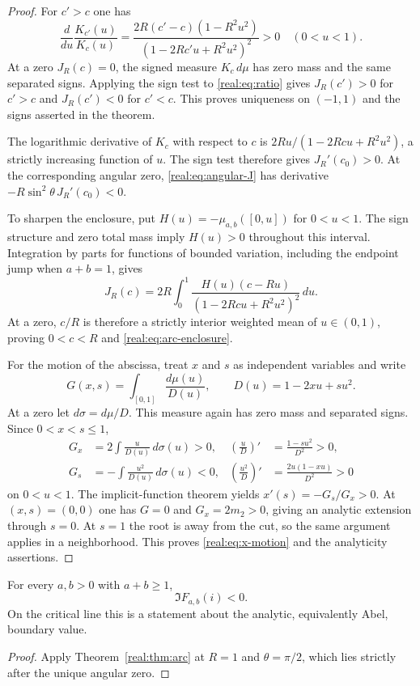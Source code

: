 \begin{proof}
For $c'>c$ one has
\begin{equation}\label{real:eq:ratio}
 \frac d{du}\frac{K_{c'}(u)}{K_c(u)}
 =\frac{2R(c'-c)(1-R^2u^2)}{(1-2Rc'u+R^2u^2)^2}>0
 \quad(0<u<1).
\end{equation}
At a zero $J_R(c)=0$, the signed measure $K_c\,d\mu$ has zero
mass and the same separated signs. Applying the sign test to
\eqref{real:eq:ratio} gives $J_R(c')>0$ for $c'>c$ and
$J_R(c')<0$ for $c'<c$. This proves uniqueness on $(-1,1)$
and the signs asserted in the theorem.

The logarithmic derivative of $K_c$ with respect to $c$ is
$2Ru/(1-2Rcu+R^2u^2)$, a strictly increasing function of $u$.
The sign test therefore gives $J_R'(c_0)>0$. At the corresponding
angular zero, \eqref{real:eq:angular-J} has derivative
$-R\sin^2\theta\,J_R'(c_0)<0$.

To sharpen the enclosure, put
$H(u)=-\mu_{a,b}([0,u])$ for $0<u<1$. The sign structure and zero
total mass imply $H(u)>0$ throughout this interval. Integration by
parts for functions of bounded variation, including the endpoint
jump when $a+b=1$, gives
\begin{equation}\label{real:eq:cumulative}
 J_R(c)=2R\int_0^1
  \frac{H(u)(c-Ru)}{(1-2Rcu+R^2u^2)^2}\,du.
\end{equation}
At a zero, $c/R$ is therefore a strictly interior weighted mean of
$u\in(0,1)$, proving $0<c<R$ and
\eqref{real:eq:arc-enclosure}.

For the motion of the abscissa, treat $x$ and $s$ as independent
variables and write
\[
 G(x,s)=\int_{[0,1]}\frac{d\mu(u)}{D(u)},\qquad
 D(u)=1-2xu+su^2.
\]
At a zero let $d\sigma=d\mu/D$. This measure again has zero mass
and separated signs. Since $0<x<s\leq1$,
\begin{align*}
 G_x&=2\int\frac{u}{D(u)}\,d\sigma(u)>0,
 &\left(\frac uD\right)'&=\frac{1-su^2}{D^2}>0,\\
 G_s&=-\int\frac{u^2}{D(u)}\,d\sigma(u)<0,
 &\left(\frac{u^2}D\right)'&=\frac{2u(1-xu)}{D^2}>0
\end{align*}
on $0<u<1$. The implicit-function theorem yields
$x'(s)=-G_s/G_x>0$. At $(x,s)=(0,0)$ one has $G=0$ and
$G_x=2m_2>0$, giving an analytic extension through $s=0$.
At $s=1$ the root is away from the cut, so the same argument applies
in a neighborhood. This proves \eqref{real:eq:x-motion} and the
analyticity assertions.
\end{proof}

\begin{corollary}
\label{real:cor:gaussian}
For every $a,b>0$ with $a+b\geq1$,
\[
 \Im F_{a,b}(i)<0.
\]
On the critical line this is a statement about the analytic, equivalently
Abel, boundary value.
\end{corollary}
\begin{proof}
Apply Theorem~\ref{real:thm:arc} at $R=1$ and $\theta=\pi/2$,
which lies strictly after the unique angular zero.
\end{proof}

